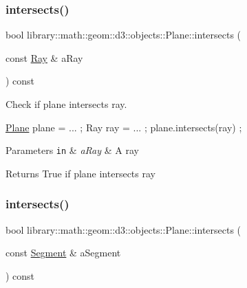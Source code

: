 \subsubsection{\texorpdfstring{intersects()}{intersects()}\hspace{0.1cm}{\footnotesize\ttfamily [4/5]}}
{\footnotesize\ttfamily bool library\+::math\+::geom\+::d3\+::objects\+::\+Plane\+::intersects (\begin{DoxyParamCaption}\item[{const \hyperlink{classlibrary_1_1math_1_1geom_1_1d3_1_1objects_1_1_ray}{Ray} \&}]{a\+Ray }\end{DoxyParamCaption}) const}



Check if plane intersects ray. 


\begin{DoxyCode}
\hyperlink{classlibrary_1_1math_1_1geom_1_1d3_1_1objects_1_1_plane_a81fe78a983e2cb6ee6ad9bfabd22c3a4}{Plane} plane = ... ;
Ray ray = ... ;
plane.intersects(ray) ;
\end{DoxyCode}



\begin{DoxyParams}[1]{Parameters}
\mbox{\tt in}  & {\em a\+Ray} & A ray \\
\hline
\end{DoxyParams}
\begin{DoxyReturn}{Returns}
True if plane intersects ray 
\end{DoxyReturn}
\mbox{\label{classlibrary_1_1math_1_1geom_1_1d3_1_1objects_1_1_plane_ac957f41b0ef16fc97d927735baac5677}} 
\subsubsection{\texorpdfstring{intersects()}{intersects()}\hspace{0.1cm}{\footnotesize\ttfamily [5/5]}}
{\footnotesize\ttfamily bool library\+::math\+::geom\+::d3\+::objects\+::\+Plane\+::intersects (\begin{DoxyParamCaption}\item[{const \hyperlink{classlibrary_1_1math_1_1geom_1_1d3_1_1objects_1_1_segment}{Segment} \&}]{a\+Segment }\end{DoxyParamCaption}) const}



